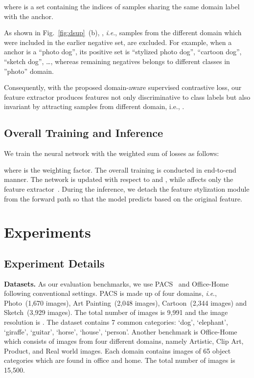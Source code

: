 \documentclass[sigconf]{acmart}
\newcommand{\ie}{\textit{i}.\textit{e}.}
\newcommand{\Fref}[1]{Fig.~\ref{#1}}
\begin{document}
where  is a set containing the indices of samples sharing the same domain label with the anchor.

As shown in \Fref{fig:dsup}~(b), , \ie, samples from the different domain which were included in the earlier negative set, are excluded. For example, when a anchor  is a ``photo dog'', its positive set  is ``stylized photo dog'', ``cartoon dog'', ``sketch dog'', \dots , whereas remaining negatives belongs to different classes in ''photo'' domain.

Consequently, with the proposed domain-aware supervised contrastive loss, our feature extractor produces features not only discriminative to class labels but also invariant by attracting samples from different domain, i.e., .

\subsection{Overall Training and Inference}

We train the neural network  with the weighted sum of losses as follows:

where  is the weighting factor. The overall training is conducted in end-to-end manner. The network  is updated with respect to  and , while  affects only the feature extractor~. During the inference, we detach the feature stylization module from the forward path so that the model predicts based on the original feature. 

\section{Experiments}
\label{sec:Experiments}

\subsection{Experiment Details}
\label{sec:experiment_details}
\textbf{Datasets.} As our evaluation benchmarks, we use PACS~\cite{Li2017DeeperBA} and Office-Home~\cite{finn2017model} following conventional settings. PACS is made up of four domains, \ie, Photo~(1,670 images), Art Painting~(2,048 images), Cartoon~(2,344 images) and Sketch~(3,929 images). The total number of images is 9,991 and the image resolution is . The dataset contains 7 common categories: `dog', `elephant', `giraffe', `guitar', `horse', `house', `person'.
Another benchmark is Office-Home which consists of images from four different domains, namely Artistic, Clip Art, Product, and Real world images. Each domain contains images of 65 object categories which are found in office and home. The total number of images is 15,500.
\end{document}
